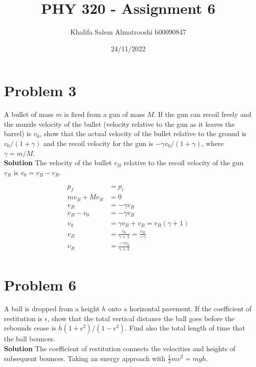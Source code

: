 \documentclass[]{article}
\title{PHY 320 - Assignment 6}
\author{Khalifa Salem Almatrooshi b00090847}
\date{24/11/2022}
\newcommand{\bd}{\textbf}
\begin{document}
	
	\maketitle
	
	\section{Problem 3}
	
	A bullet of mass $m$ is fired from a gun of mass $M$. If the gun can recoil freely and the muzzle velocity of the bullet (velocity relative to the gun as it leaves the barrel) is $v_0$, show that the actual velocity of the bullet relative to the ground is $v_0 / (1 + \gamma)$ and the recoil velocity for the gun is $-\gamma v_0 / (1 + \gamma)$, where $\gamma = m / M$. \\
	
	\bd{Solution} The velocity of the bullet $v_B$ relative to the recoil velocity of the gun $v_R$ is $v_0 = v_B - v_R$.
	
	\begin{equation}
		\begin{split}
			p_f &= p_i \\
			mv_B + Mv_R &= 0 \\
			v_R &= -\gamma v_B \\
			v_B - v_0 &= -\gamma v_B \\
			v_0 &= \gamma v_B + v_B = v_B(\gamma + 1) \\
			v_B &= \frac{v_0}{\gamma + 1} = \frac{v_R}{-\gamma} \\
			v_R &= \frac{-\gamma v_0}{\gamma + 1} \\
		\end{split}
	\end{equation}
	 
	\section{Problem 6}
	
	A ball is dropped from a height $h$ onto a horizontal pavement. If the coefficient of restitution is $\epsilon$, show that the total vertical distance the ball goes before the rebounds cease is $h(1+\epsilon^2)/(1-\epsilon^2)$. Find also the total length of time that the ball bounces. \\
	
	\bd{Solution} The coefficient of restitution connects the velocities and heights of subsequent bounces. Taking an energy approach with $\frac{1}{2}mv^2 = mgh$.
	
\end{document}
